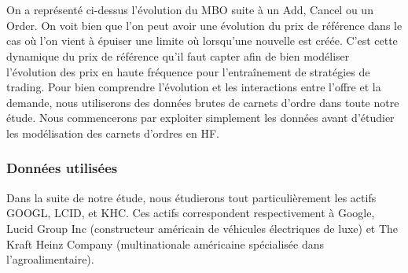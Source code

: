 \documentclass[12pt,a4paper]{article}
\theoremstyle{definition}
\theoremstyle{remark}
\begin{document}
\\
\\
On a représenté ci-dessus l'évolution du MBO suite à un Add, Cancel ou un Order. On voit bien que l'on peut avoir une évolution du prix de référence dans le cas où l'on vient à épuiser une limite où lorsqu'une nouvelle est créée. C'est cette dynamique du prix de référence qu'il faut capter afin de bien modéliser l'évolution des prix en haute fréquence pour l'entraînement de stratégies de trading. Pour bien comprendre l'évolution et les interactions entre l'offre et la demande, nous utiliserons des données brutes de carnets d'ordre dans toute notre étude. Nous commencerons par exploiter simplement les données avant d'étudier les modélisation des carnets d'ordres en HF.


\subsubsection{Données utilisées}
Dans la suite de notre étude, nous étudierons tout particulièrement les actifs GOOGL, LCID, et KHC. Ces actifs correspondent respectivement à Google, Lucid Group Inc (constructeur américain de véhicules électriques de luxe) et The Kraft Heinz Company (multinationale américaine spécialisée dans l'agroalimentaire).
\end{document}
